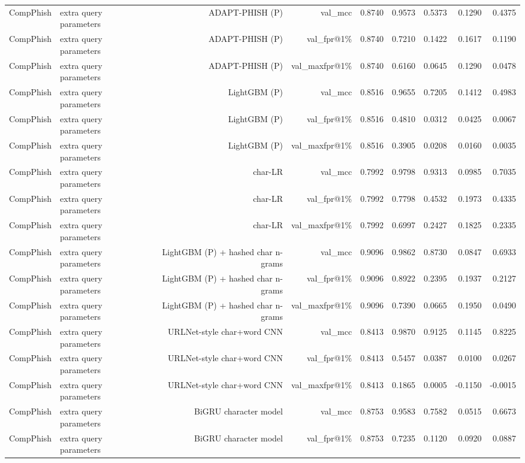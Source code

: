 \begin{table}[t]
\begin{tabular}{llrrrrrrr}
CompPhish & extra query parameters & ADAPT-PHISH (P) & val\_mcc & 0.8740 & 0.9573 & 0.5373 & 0.1290 & 0.4375 \\
CompPhish & extra query parameters & ADAPT-PHISH (P) & val\_fpr@1\% & 0.8740 & 0.7210 & 0.1422 & 0.1617 & 0.1190 \\
CompPhish & extra query parameters & ADAPT-PHISH (P) & val\_maxfpr@1\% & 0.8740 & 0.6160 & 0.0645 & 0.1290 & 0.0478 \\
CompPhish & extra query parameters & LightGBM (P) & val\_mcc & 0.8516 & 0.9655 & 0.7205 & 0.1412 & 0.4983 \\
CompPhish & extra query parameters & LightGBM (P) & val\_fpr@1\% & 0.8516 & 0.4810 & 0.0312 & 0.0425 & 0.0067 \\
CompPhish & extra query parameters & LightGBM (P) & val\_maxfpr@1\% & 0.8516 & 0.3905 & 0.0208 & 0.0160 & 0.0035 \\
CompPhish & extra query parameters & char-LR & val\_mcc & 0.7992 & 0.9798 & 0.9313 & 0.0985 & 0.7035 \\
CompPhish & extra query parameters & char-LR & val\_fpr@1\% & 0.7992 & 0.7798 & 0.4532 & 0.1973 & 0.4335 \\
CompPhish & extra query parameters & char-LR & val\_maxfpr@1\% & 0.7992 & 0.6997 & 0.2427 & 0.1825 & 0.2335 \\
CompPhish & extra query parameters & LightGBM (P) + hashed char n-grams & val\_mcc & 0.9096 & 0.9862 & 0.8730 & 0.0847 & 0.6933 \\
CompPhish & extra query parameters & LightGBM (P) + hashed char n-grams & val\_fpr@1\% & 0.9096 & 0.8922 & 0.2395 & 0.1937 & 0.2127 \\
CompPhish & extra query parameters & LightGBM (P) + hashed char n-grams & val\_maxfpr@1\% & 0.9096 & 0.7390 & 0.0665 & 0.1950 & 0.0490 \\
CompPhish & extra query parameters & URLNet-style char+word CNN & val\_mcc & 0.8413 & 0.9870 & 0.9125 & 0.1145 & 0.8225 \\
CompPhish & extra query parameters & URLNet-style char+word CNN & val\_fpr@1\% & 0.8413 & 0.5457 & 0.0387 & 0.0100 & 0.0267 \\
CompPhish & extra query parameters & URLNet-style char+word CNN & val\_maxfpr@1\% & 0.8413 & 0.1865 & 0.0005 & -0.1150 & -0.0015 \\
CompPhish & extra query parameters & BiGRU character model & val\_mcc & 0.8753 & 0.9583 & 0.7582 & 0.0515 & 0.6673 \\
CompPhish & extra query parameters & BiGRU character model & val\_fpr@1\% & 0.8753 & 0.7235 & 0.1120 & 0.0920 & 0.0887 \\

\end{tabular}
\end{table}
